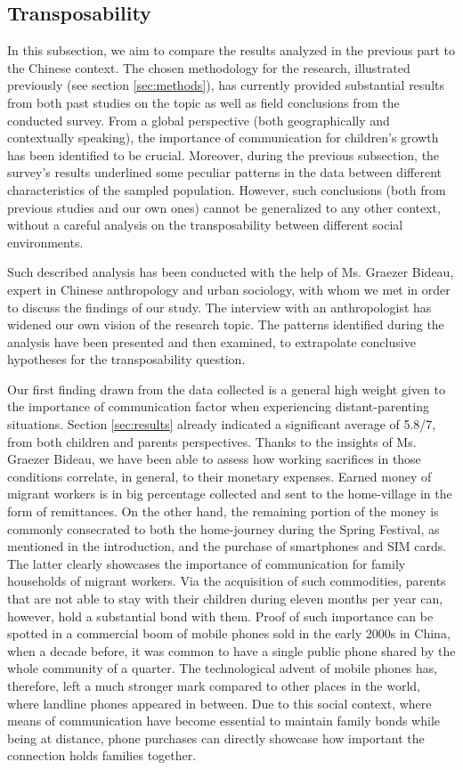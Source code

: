 \subsection{Transposability}
\label{transposability}

In this subsection, we aim to compare the results analyzed in the previous part to the Chinese context. The chosen methodology for the research, illustrated previously (see section \ref{sec:methods}), has currently provided substantial results from both past studies on the topic as well as field conclusions from the conducted survey. From a global perspective (both geographically and contextually speaking), the importance of communication for children's growth has been identified to be crucial. Moreover, during the previous subsection, the survey's results underlined some peculiar patterns in the data between different characteristics of the sampled population. However, such conclusions (both from previous studies and our own ones) cannot be generalized to any other context, without a careful analysis on the transposability between different social environments.

Such described analysis has been conducted with the help of Ms. Graezer Bideau, expert in Chinese anthropology and urban sociology, with whom we met in order to discuss the findings of our study. The interview with an anthropologist has widened our own vision of the research topic. The patterns identified during the analysis have been presented and then examined, to extrapolate conclusive hypotheses for the transposability question.  

Our first finding drawn from the data collected is a general high weight given to the importance of communication factor when experiencing distant-parenting situations. Section \ref{sec:results} already indicated a significant average of 5.8/7, from both children and parents perspectives. Thanks to the insights of Ms. Graezer Bideau, we have been able to assess how working sacrifices in those conditions correlate, in general, to their monetary expenses. Earned money of migrant workers is in big percentage collected and sent to the home-village in the form of remittances. On the other hand, the remaining portion of the money is commonly consecrated to both the home-journey during the Spring Festival, as mentioned in the introduction, and the purchase of smartphones and SIM cards. The latter clearly showcases the importance of communication for family households of migrant workers. Via the acquisition of such commodities, parents that are not able to stay with their children during eleven months per year can, however, hold a substantial bond with them. Proof of such importance can be spotted in a commercial boom of mobile phones sold in the early 2000s in China, when a decade before, it was common to have a single public phone shared by the whole community of a quarter. The technological advent of mobile phones has, therefore, left a much stronger mark compared to other places in the world, where landline phones appeared in between. Due to this social context, where means of communication have become essential to maintain family bonds while being at distance, phone purchases can directly showcase how important the connection holds families together.

